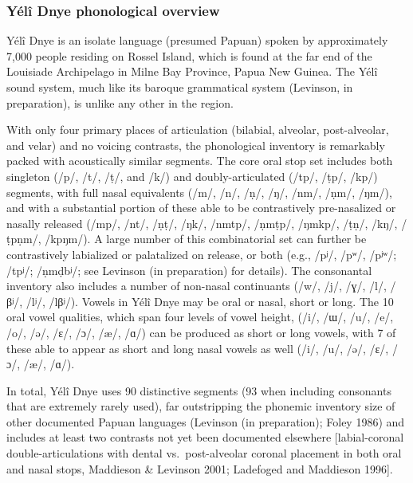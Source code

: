 \documentclass[english,,man,floatsintext]{apa6}
\begin{document}
\subsubsection{Yélî Dnye phonological
overview}\label{yuxe9luxee-dnye-phonological-overview}

Yélî Dnye is an isolate language (presumed Papuan) spoken by
approximately 7,000 people residing on Rossel Island, which is found at
the far end of the Louisiade Archipelago in Milne Bay Province, Papua
New Guinea. The Yélî sound system, much like its baroque grammatical
system (Levinson, in preparation), is unlike any other in the region.

With only four primary places of articulation (bilabial, alveolar,
post-alveolar, and velar) and no voicing contrasts, the phonological
inventory is remarkably packed with acoustically similar segments. The
core oral stop set includes both singleton (/p/, /t/, /ṭ/, and /k/) and
doubly-articulated (/tp/, /ṭp/, /kp/) segments, with full nasal
equivalents (/m/, /n/, /ṇ/, /ŋ/, /nm/, /ṇm/, /ŋm/), and with a
substantial portion of these able to be contrastively pre-nasalized or
nasally released (/mp/, /nt/, /ṇṭ/, /ŋk/, /nmtp/, /ṇmṭp/, /ŋmkp/, /ṭṇ/,
/kŋ/, /ṭpṇm/, /kpŋm/). A large number of this combinatorial set can
further be contrastively labialized or palatalized on release, or both
(e.g., /pʲ/, /pʷ/, /pʲʷ/; /tpʲ/; /ṇmḍbʲ/; see Levinson (in preparation)
for details). The consonantal inventory also includes a number of
non-nasal continuants (/w/, /j/, /ɣ/, /l/, /βʲ/, /lʲ/, /lβʲ/). Vowels in
Yélî Dnye may be oral or nasal, short or long. The 10 oral vowel
qualities, which span four levels of vowel height, (/i/, /ɯ/, /u/, /e/,
/o/, /ə/, /ɛ/, /ɔ/, /æ/, /ɑ/) can be produced as short or long vowels,
with 7 of these able to appear as short and long nasal vowels as well
(/i/, /u/, /ə/, /ɛ/, /ɔ/, /æ/, /ɑ/).

In total, Yélî Dnye uses 90 distinctive segments (93 when including
consonants that are extremely rarely used), far outstripping the
phonemic inventory size of other documented Papuan languages (Levinson
(in preparation); Foley 1986) and includes at least two contrasts not
yet been documented elsewhere {[}labial-coronal double-articulations
with dental vs.~post-alveolar coronal placement in both oral and nasal
stops, Maddieson \& Levinson 2001; Ladefoged and Maddieson 1996{]}.
\end{document}
